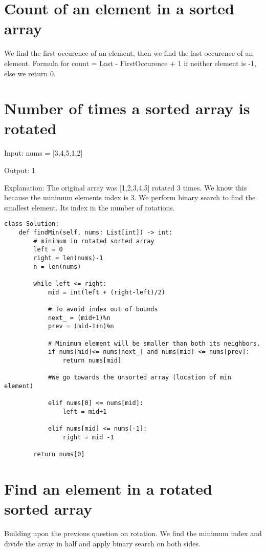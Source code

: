 \documentclass[24pt, a4]{article}
\begin{document}
\section{Count of an element in a sorted array}
We find the first occurence of an element, then we find the last occurence of 
an element. Formula for count = Last - FirstOccurence + 1 if neither element
is -1, else we return 0.

\section{Number of times a sorted array is rotated}
Input: nums = [3,4,5,1,2]

Output: 1

Explanation: The original array was [1,2,3,4,5] rotated 3 times. We know this
because the minimum elements index is 3. We perform binary search to find the
smallest element. Its index in the number of rotations.

\begin{lstlisting}
class Solution:
    def findMin(self, nums: List[int]) -> int:
        # minimum in rotated sorted array
        left = 0
        right = len(nums)-1
        n = len(nums)

        while left <= right:
            mid = int(left + (right-left)/2)

            # To avoid index out of bounds
            next_ = (mid+1)%n
            prev = (mid-1+n)%n
            
            # Minimum element will be smaller than both its neighbors.
            if nums[mid]<= nums[next_] and nums[mid] <= nums[prev]:
                return nums[mid]
            
            #We go towards the unsorted array (location of min element)

            elif nums[0] <= nums[mid]:
                left = mid+1
        
            elif nums[mid] <= nums[-1]:
                right = mid -1
        
        return nums[0]
\end{lstlisting}

\newpage
\section{Find an element in a rotated sorted array}

Building upon the previous question on rotation. We find the minimum index
and divide the array in half and apply binary search on both sides.
\end{document}
